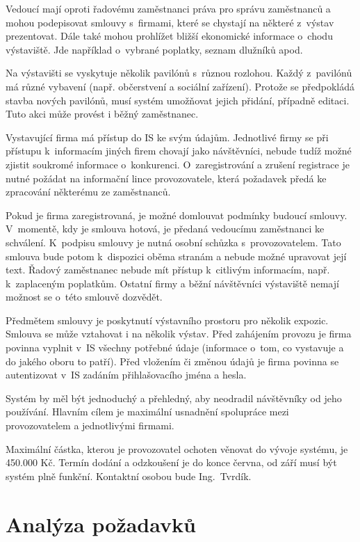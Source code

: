 Vedoucí mají oproti řadovému zaměstnanci práva pro správu zaměstnanců a mohou
podepisovat smlouvy s~firmami, které se chystají na některé z~výstav
prezentovat. Dále také mohou prohlížet bližší ekonomické informace o~chodu
výstaviště. Jde například o~vybrané poplatky, seznam dlužníků apod.

Na výstavišti se vyskytuje několik pavilónů s~různou rozlohou. Každý z~pavilónů
má různé vybavení (např. občerstvení a sociální zařízení). Protože se
předpokládá stavba nových pavilónů, musí systém umožňovat jejich přidání,
případně editaci. Tuto akci může provést i běžný zaměstnanec.

Vystavující firma má přístup do IS ke svým údajům. Jednotlivé firmy se při
přístupu k~informacím jiných firem chovají jako návštěvníci, nebude tudíž možné
zjistit soukromé informace o~konkurenci. O~zaregistrování a zrušení registrace
je nutné požádat na informační lince provozovatele, která požadavek předá ke
zpracování některému ze zaměstnanců.

Pokud je firma zaregistrovaná, je možné domlouvat podmínky budoucí smlouvy.
V~momentě, kdy je smlouva hotová, je předaná vedoucímu zaměstnanci ke
schválení. K~podpisu smlouvy je nutná osobní schůzka s~provozovatelem. Tato
smlouva bude potom k~dispozici oběma stranám a nebude možné upravovat její
text. Řadový zaměstnanec nebude mít přístup k~citlivým informacím, např.
k~zaplaceným poplatkům. Ostatní firmy a běžní návštěvníci výstaviště nemají
možnost se o~této smlouvě dozvědět.

Předmětem smlouvy je poskytnutí výstavního prostoru pro několik expozic.
Smlouva se může vztahovat i na několik výstav. Před zahájením provozu je firma
povinna vyplnit v~IS všechny potřebné údaje (informace o~tom, co vystavuje a do
jakého oboru to patří). Před vložením či změnou údajů je firma povinna se
autentizovat v~IS zadáním přihlašovacího jména a hesla.

Systém by měl být jednoduchý a přehledný, aby neodradil návštěvníky od jeho
používání. Hlavním cílem je maximální usnadnění spolupráce mezi provozovatelem
a jednotlivými firmami.

Maximální částka, kterou je provozovatel ochoten věnovat do vývoje systému, je
450.000 Kč. Termín dodání a odzkoušení je do konce června, od září musí být
systém plně funkční. Kontaktní osobou bude Ing.~Tvrdík.

\pagebreak
\section*{Analýza požadavků}

